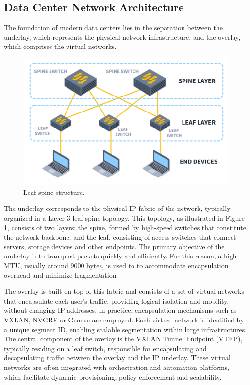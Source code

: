\subsection{Data Center Network Architecture}
The foundation of modern data centers lies in the separation between the underlay, which represents the physical network infrastructure, and the overlay, which comprises the virtual networks. 
\newpage
\begin{figure}
    \centering
    \vspace{-5pt}
    \includegraphics[width=0.9\linewidth]{Figures/LeafSpine.png}
    \caption{Leaf-spine structure. \cite{leafspine}}
    \label{leafSpine}
    \vspace{-10pt}
\end{figure}

The underlay corresponds to the physical IP fabric of the network, typically organized in a Layer 3 leaf-spine topology. This topology, as illustrated in Figure \ref{leafSpine}, consists of two layers: the spine, formed by high-speed switches that constitute the network backbone; and the leaf, consisting of access switches that connect servers, storage devices and other endpoints. The primary objective of the underlay is to transport packets quickly and efficiently. For this reason, a high MTU, usually around 9000 bytes, is used to to accommodate encapsulation overhead and minimize fragmentation. 

The overlay is built on top of this fabric and consists of a set of virtual networks that encapsulate each user's traffic, providing logical isolation and mobility, without changing IP addresses. In practice, encapsulation mechanisms such as VXLAN, NVGRE or Geneve are employed. Each virtual network is identified by a unique segment ID, enabling scalable segmentation within large infrastructures. The central component of the overlay is the VXLAN Tunnel Endpoint (VTEP), typically residing on a leaf switch, responsible for encapsulating and decapsulating traffic between the overlay and the IP underlay. These virtual networks are often integrated with orchestration and automation platforms, which facilitate dynamic provisioning, policy enforcement and scalability. 

